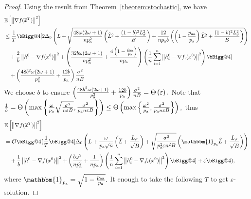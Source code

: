\documentclass{article}
\makeatletter
\newcommand*{\probavailable}{\ensuremath{p_{\textnormal{a}}}}
\newcommand*{\probpairaa}{\ensuremath{p_{\textnormal{aa}}}}
\newcommand{\vast}{\bBigg@{4}}
\makeatother
\begin{document}
  \begin{proof}
    Using the result from Theorem~\ref{theorem:stochastic}, we have
    \begin{align*}
        &\Exp{\norm{\nabla f(\widehat{x}^T)}^2} \\
        &\leq \frac{1}{T}\vast[2 \Delta_0\left(L + \sqrt{\frac{48 \omega (2 \omega + 1)}{n \probavailable^2} \left(\widehat{L}^2 + \frac{(1 - b)^2 L_{\sigma}^2}{B}\right) + \frac{12}{n \probavailable b}\left(\left(1 - \frac{\probpairaa}{\probavailable}\right) \widehat{L}^2 + \frac{(1 - b)^2 L_{\sigma}^2}{B}\right)}\right) \\
        &\quad + \frac{2}{b} \norm{h^{0} - \nabla f(x^{0})}^2 + \left(\frac{32 b \omega (2 \omega + 1)}{n \probavailable^2} + \frac{4 \left(1 - \frac{\probpairaa}{\probavailable}\right)}{n \probavailable}\right)\left(\frac{1}{n}\sum_{i=1}^n\norm{h^{0}_i - \nabla f_i(x^{0})}^2\right)\vast] \\
        &\quad+ \left(\frac{48 b^2 \omega (2 \omega + 1)}{\probavailable^2} + \frac{12 b}{\probavailable}\right) \frac{\sigma^2}{n B}
    \end{align*}
    We choose $b$ to ensure $\left(\frac{48 b^2 \omega (2 \omega + 1)}{\probavailable^2} + \frac{12 b}{\probavailable}\right) \frac{\sigma^2}{n B} = \Theta\left(\varepsilon\right).$ Note that $\frac{1}{b} = \Theta\left(\max\left\{\frac{\omega}{\probavailable} \sqrt{\frac{\sigma^2}{n \varepsilon B}}, \frac{\sigma^2}{\probavailable n \varepsilon B}\right\}\right) \leq \Theta\left(\max\left\{\frac{\omega^2}{\probavailable}, \frac{\sigma^2}{\probavailable n \varepsilon B}\right\}\right),$ thus
    \begin{align*}
        &\Exp{\norm{\nabla f(\widehat{x}^T)}^2} \\
        &= \cO\vast(\frac{1}{T}\vast[\Delta_0\left(L + \frac{\omega}{\probavailable \sqrt{n}} \left(\widehat{L} + \frac{L_{\sigma}}{\sqrt{B}}\right) + \sqrt{\frac{\sigma^2}{\probavailable^2 \varepsilon n^2 B}}\left(\mathbbm{1}_{\probavailable}\widehat{L} + \frac{L_{\sigma}}{\sqrt{B}}\right)\right)\\
        &\quad + \frac{1}{b} \norm{h^{0} - \nabla f(x^{0})}^2 + \left(\frac{b \omega^2}{n \probavailable^2} + \frac{1}{n \probavailable}\right)\left(\frac{1}{n}\sum_{i=1}^n\norm{h^{0}_i - \nabla f_i(x^{0})}^2\right)\vast] + \varepsilon\vast),
    \end{align*}
    where $\mathbbm{1}_{\probavailable} = \sqrt{1 - \frac{\probpairaa}{\probavailable}}.$
    It enough to take the following $T$ to get $\varepsilon$-solution.

\end{proof}
\end{document}
